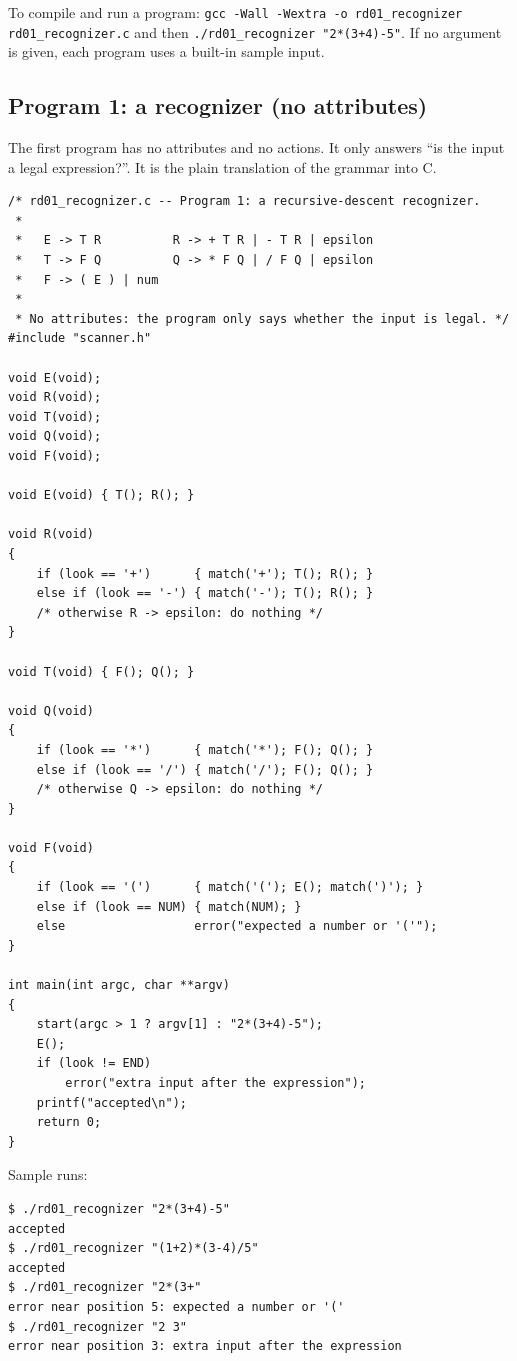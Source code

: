 \documentclass[11pt,a4paper]{article}
\begin{document}
To compile and run a program: \texttt{gcc -Wall -Wextra -o rd01\_recognizer rd01\_recognizer.c} and then \texttt{./rd01\_recognizer "2*(3+4)-5"}. If no argument is given, each program uses a built-in sample input.

\subsection{Program 1: a recognizer (no attributes)}
\label{sec:rd1}

The first program has no attributes and no actions. It only answers ``is the input a legal expression?''. It is the plain translation of the grammar into C.

\begin{lstlisting}[basicstyle=\ttfamily\footnotesize,tabsize=4]
/* rd01_recognizer.c -- Program 1: a recursive-descent recognizer.
 *
 *   E -> T R          R -> + T R | - T R | epsilon
 *   T -> F Q          Q -> * F Q | / F Q | epsilon
 *   F -> ( E ) | num
 *
 * No attributes: the program only says whether the input is legal. */
#include "scanner.h"

void E(void);
void R(void);
void T(void);
void Q(void);
void F(void);

void E(void) { T(); R(); }

void R(void)
{
    if (look == '+')      { match('+'); T(); R(); }
    else if (look == '-') { match('-'); T(); R(); }
    /* otherwise R -> epsilon: do nothing */
}

void T(void) { F(); Q(); }

void Q(void)
{
    if (look == '*')      { match('*'); F(); Q(); }
    else if (look == '/') { match('/'); F(); Q(); }
    /* otherwise Q -> epsilon: do nothing */
}

void F(void)
{
    if (look == '(')      { match('('); E(); match(')'); }
    else if (look == NUM) { match(NUM); }
    else                  error("expected a number or '('");
}

int main(int argc, char **argv)
{
    start(argc > 1 ? argv[1] : "2*(3+4)-5");
    E();
    if (look != END)
        error("extra input after the expression");
    printf("accepted\n");
    return 0;
}
\end{lstlisting}

Sample runs:
\begin{lstlisting}[basicstyle=\ttfamily\footnotesize,tabsize=4]
$ ./rd01_recognizer "2*(3+4)-5"
accepted
$ ./rd01_recognizer "(1+2)*(3-4)/5"
accepted
$ ./rd01_recognizer "2*(3+"
error near position 5: expected a number or '('
$ ./rd01_recognizer "2 3"
error near position 3: extra input after the expression
\end{lstlisting}
\end{document}
